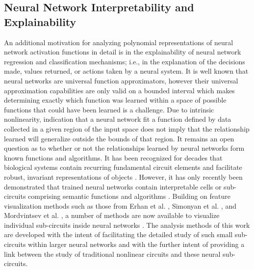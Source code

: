 \subsection{Neural Network Interpretability and Explainability}
An additional motivation for analyzing polynomial representations of neural network activation functions in detail is in the explainability of neural network regression and classification mechanisms; i.e., in the explanation of the decisions made, values returned, or actions taken by a neural system.  It is well known that neural networks are universal function approximators, however their universal approximation capabilities are only valid on a bounded interval \cite{cybenko_approximation_1989} which makes determining exactly which function was learned within a space of possible functions that could have been learned is a challenge.  Due to intrinsic nonlinearity, indication that a neural network fit a function defined by data collected in a given region of the input space does not imply that the relationship learned will generalize outside the bounds of that region.  It remains an open question as to whether or not the relationships learned by neural networks form known functions and algorithms.  It has been recognized for decades that biological systems contain recurring fundamental circuit elements \cite{alon_introduction_2006} and facilitate robust, invariant representations of objects \cite{quiroga_invariant_2005}.  However, it has only recently been demonstrated that trained neural networks contain interpretable cells or sub-circuits comprising semantic functions and algorithms \cite{karpathy_visualizing_2015,zhou_object_2015,bau_network_2017,gonzalez-garcia_semantic_2017,olah2020zoom}.  Building on feature visualization methods such as those from Erhan et al. \cite{erhan2009visualizing}, Simonyan et al. \cite{simonyan_deep_2014}, and Mordvintsev et al. \cite{mordvinsev2015inceptionism}, a number of methods are now available to visualize individual sub-circuits inside neural networks \cite{nguyen_synthesizing_2016,nguyen_plug_2017,olah2017feature,hohman_summit:_2019,carter2019activation}.  The analysis methods of this work are developed with the intent of facilitating the detailed study of such small sub-circuits within larger neural networks and with the further intent of providing a link between the study of traditional nonlinear circuits and these neural sub-circuits.

